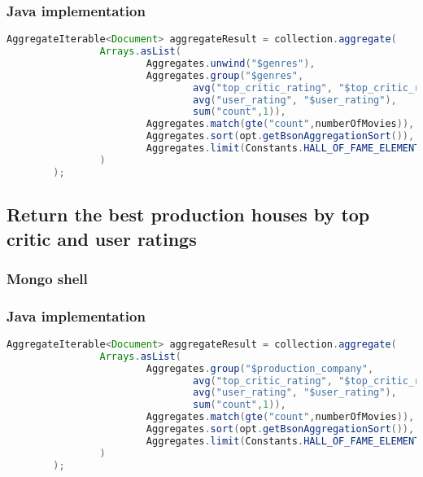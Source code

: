 \subsubsection{Java implementation}
\begin{lstlisting}[language=Java, caption= MovieMongoDBDAO.java]
AggregateIterable<Document> aggregateResult = collection.aggregate(
                Arrays.asList(
                        Aggregates.unwind("$genres"),
                        Aggregates.group("$genres",
                                avg("top_critic_rating", "$top_critic_rating"),
                                avg("user_rating", "$user_rating"),
                                sum("count",1)),
                        Aggregates.match(gte("count",numberOfMovies)),
                        Aggregates.sort(opt.getBsonAggregationSort()),
                        Aggregates.limit(Constants.HALL_OF_FAME_ELEMENT_NUMBERS)
                )
        );
\end{lstlisting}

\subsection{Return the best production houses by top critic and user ratings}\label{subsec:productionHouses}
\subsubsection{Mongo shell}


\subsubsection{Java implementation}
\begin{lstlisting}[language=Java, caption = MovieMongoDBDAO.java ]
AggregateIterable<Document> aggregateResult = collection.aggregate(
                Arrays.asList(
                        Aggregates.group("$production_company",
                                avg("top_critic_rating", "$top_critic_rating"),
                                avg("user_rating", "$user_rating"),
                                sum("count",1)),
                        Aggregates.match(gte("count",numberOfMovies)),
                        Aggregates.sort(opt.getBsonAggregationSort()),
                        Aggregates.limit(Constants.HALL_OF_FAME_ELEMENT_NUMBERS)
                )
        );
\end{lstlisting}
